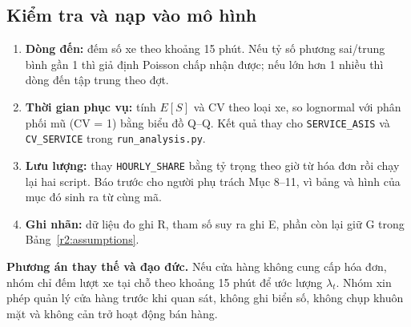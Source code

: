 \subsection{Kiểm tra và nạp vào mô hình}
\begin{enumerate}
\item \textbf{Dòng đến:} đếm số xe theo khoảng 15 phút. Nếu tỷ số phương sai/trung
bình gần 1 thì giả định Poisson chấp nhận được; nếu lớn hơn 1 nhiều thì dòng
đến tập trung theo đợt.
\item \textbf{Thời gian phục vụ:} tính $E[S]$ và CV theo loại xe, so lognormal
với phân phối mũ (CV = 1) bằng biểu đồ Q--Q. Kết quả thay cho
\texttt{SERVICE\_ASIS} và \texttt{CV\_SERVICE} trong \texttt{run\_analysis.py}.
\item \textbf{Lưu lượng:} thay \texttt{HOURLY\_SHARE} bằng tỷ trọng theo giờ từ hóa
đơn rồi chạy lại hai script. Báo trước cho người phụ trách Mục 8--11, vì bảng
và hình của mục đó sinh ra từ cùng mã.
\item \textbf{Ghi nhãn:} dữ liệu đo ghi R, tham số suy ra ghi E, phần còn lại
giữ G trong Bảng~\ref{r2:assumptions}.
\end{enumerate}

\textbf{Phương án thay thế và đạo đức.} Nếu cửa hàng không cung cấp hóa đơn,
nhóm chỉ đếm lượt xe tại chỗ theo khoảng 15 phút để ước lượng $\lambda_t$. Nhóm
xin phép quản lý cửa hàng trước khi quan sát, không ghi biển số, không chụp
khuôn mặt và không cản trở hoạt động bán hàng.
